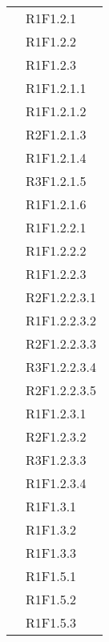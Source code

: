 \begin{longtable}{|>{\centering}m{5cm}|m{5cm}<{\centering}|}
&{R1F1.2.1}\\
&{R1F1.2.2}\\
&{R1F1.2.3}\\
&{R1F1.2.1.1}\\
&{R1F1.2.1.2}\\
&{R2F1.2.1.3}\\
&{R1F1.2.1.4}\\
&{R3F1.2.1.5}\\
&{R1F1.2.1.6}\\
&{R1F1.2.2.1}\\
&{R1F1.2.2.2}\\
&{R1F1.2.2.3}\\
&{R2F1.2.2.3.1}\\
&{R1F1.2.2.3.2}\\
&{R2F1.2.2.3.3}\\
&{R3F1.2.2.3.4}\\
&{R2F1.2.2.3.5}\\
&{R1F1.2.3.1}\\
&{R2F1.2.3.2}\\
&{R3F1.2.3.3}\\
&{R1F1.2.3.4}\\
&{R1F1.3.1}\\
&{R1F1.3.2}\\
&{R1F1.3.3}\\
&{R1F1.5.1}\\
&{R1F1.5.2}\\
&{R1F1.5.3}\\


\end{longtable}

